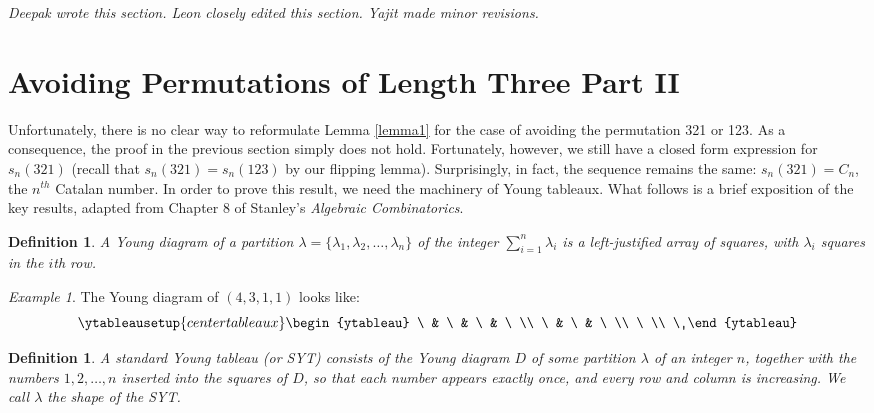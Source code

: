 \documentclass[11pt,letterpaper,twoside,english]{article}
\theoremstyle{theorem}
\newtheorem{definition}[theorem]{Definition}
\theoremstyle{remark}
\newtheorem{example}[theorem]{Example}
\begin{document}
\emph{Deepak wrote this section. Leon closely edited this section. Yajit made minor revisions.}

\section{Avoiding Permutations of Length Three Part II}

\label{321}
Unfortunately, there is no clear way to reformulate Lemma \ref{lemma1} for the case of avoiding the permutation 321 or 123. As a consequence, the proof in the previous section simply does not hold. Fortunately, however, we still have a closed form expression for $s_n(321)$ (recall that $s_n(321)=s_n(123)$ by our flipping lemma). Surprisingly, in fact, the sequence remains the same: $s_n(321)=C_n$, the $n^{th}$ Catalan number. In order to prove this result, we need the machinery of Young tableaux. What follows is a brief exposition of the key results, adapted from Chapter 8 of Stanley's \emph{Algebraic Combinatorics}.

\begin{definition}
A Young diagram of a partition $\lambda=\{\lambda_1, \lambda_2, \ldots, \lambda_n\}$ of the integer $\sum_{i=1}^n \lambda_i$ is a left-justified array of squares, with $\lambda_i$ squares in the $i$th row.
\end{definition}
\begin{example}
The Young diagram of $(4, 3, 1, 1)$ looks like:
\[
\ytableausetup{centertableaux}
\begin{ytableau}
\ & \ & \ & \ \\
\ & \ & \ \\
\ \\
\
\end{ytableau}
\]
\end{example}

\begin{definition}
A standard Young tableau (or SYT) consists of the Young diagram $D$ of some partition $\lambda$ of an integer $n$, together with the numbers $1, 2, \ldots, n$ inserted into the squares of $D$, so that each number appears exactly once, and every row and column is \emph{increasing}. We call $\lambda$ the \emph{shape} of the SYT.
\end{definition}
\end{document}

